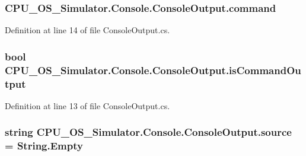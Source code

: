 \subsubsection[{command}]{ C\+P\+U\+\_\+\+O\+S\+\_\+\+Simulator.\+Console.\+Console\+Output.\+command\hspace{0.3cm}{\ttfamily [private]}}\label{class_c_p_u___o_s___simulator_1_1_console_1_1_console_output_aef6097d68fb3e2e83043c3857fdb8d56}


Definition at line 14 of file Console\+Output.\+cs.

\hypertarget{class_c_p_u___o_s___simulator_1_1_console_1_1_console_output_a916cf1368a1974e808ce0f77e850bc98}{}
\subsubsection[{is\+Command\+Output}]{\setlength{\rightskip}{0pt plus 5cm}bool C\+P\+U\+\_\+\+O\+S\+\_\+\+Simulator.\+Console.\+Console\+Output.\+is\+Command\+Output\hspace{0.3cm}{\ttfamily [private]}}\label{class_c_p_u___o_s___simulator_1_1_console_1_1_console_output_a916cf1368a1974e808ce0f77e850bc98}


Definition at line 13 of file Console\+Output.\+cs.

\hypertarget{class_c_p_u___o_s___simulator_1_1_console_1_1_console_output_a3873d00cdb36068d1108fb012857504a}{}
\subsubsection[{source}]{\setlength{\rightskip}{0pt plus 5cm}string C\+P\+U\+\_\+\+O\+S\+\_\+\+Simulator.\+Console.\+Console\+Output.\+source = String.\+Empty\hspace{0.3cm}{\ttfamily [private]}}\label{class_c_p_u___o_s___simulator_1_1_console_1_1_console_output_a3873d00cdb36068d1108fb012857504a}


